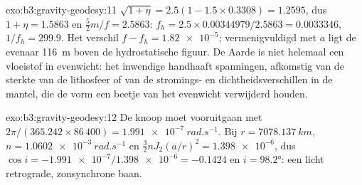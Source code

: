 \begin{solution}{exo:b3:gravity-geodesy:11}
$\sqrt{1 + \eta} = 2.5(1 - 1.5\times0.3308) = 1.2595$, dus $1 + \eta = 1.5863$
en $\tfrac52m/f = 2.5863$: $f_h = 2.5\times0.00344979/2.5863 = \num{0.0033346}$,
$1/f_h = 299.9$. Het verschil $f - f_h = \num{1.82e-5}$; vermenigvuldigd met $a$ ligt de
evenaar \qty{116}{m} boven de hydrostatische figuur. De Aarde is niet helemaal
een vloeistof in evenwicht: het inwendige handhaaft spanningen, afkomstig van de sterkte van
de lithosfeer of van de stromings- en dichtheidsverschillen in de mantel, die
de vorm een beetje van het evenwicht verwijderd houden.
\end{solution}

\begin{solution}{exo:b3:gravity-geodesy:12}
De knoop moet vooruitgaan met $2\pi/(365.242\times86\,400) =
\qty{1.991e-7}{rad.s^{-1}}$. Bij $r = \qty{7078.137}{km}$, $n =
\qty{1.0602e-3}{rad.s^{-1}}$ en $\tfrac32nJ_2(a/r)^2 = \num{1.398e-6}$, dus
$\cos i = -\num{1.991e-7}/\num{1.398e-6} = -0.1424$ en $i = \ang{98.2}$: een
licht retrograde, zonsynchrone baan.
\end{solution}


